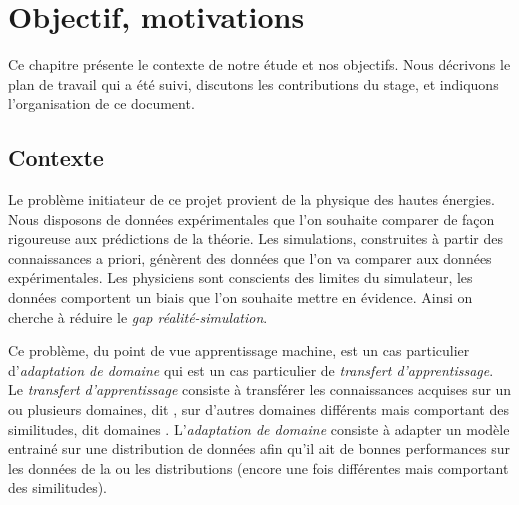 
\chapter{Objectif, motivations}
Ce chapitre présente le contexte de notre étude et nos objectifs. Nous décrivons le plan de travail qui a été suivi, discutons les contributions du stage, et indiquons l'organisation de ce document.

\section{Contexte}

Le problème initiateur de ce projet provient de la physique des hautes énergies.
Nous disposons de données expérimentales que l'on souhaite comparer de façon rigoureuse
aux prédictions de la théorie.
Les simulations, construites à partir des connaissances a priori, génèrent des données
que l'on va comparer aux données expérimentales.
Les physiciens sont conscients des limites du simulateur, les données comportent un biais
que l'on souhaite mettre en évidence.
Ainsi on cherche à réduire le \emph{gap réalité-simulation}.

Ce problème, du point de vue apprentissage machine, est un cas particulier d'\emph{adaptation de domaine}
qui est un cas particulier de \emph{transfert d'apprentissage}.
Le \emph{transfert d'apprentissage} consiste à transférer les connaissances 
acquises sur un ou plusieurs domaines, dit \sources{}, sur d'autres domaines 
différents mais comportant des similitudes, dit domaines \cibles{}.
L'\emph{adaptation de domaine} consiste à adapter un modèle entrainé sur une distribution de données \sources{}
afin qu'il ait de bonnes performances sur les données de la ou les distributions \cibles{} 
(encore une fois différentes mais comportant des similitudes).

